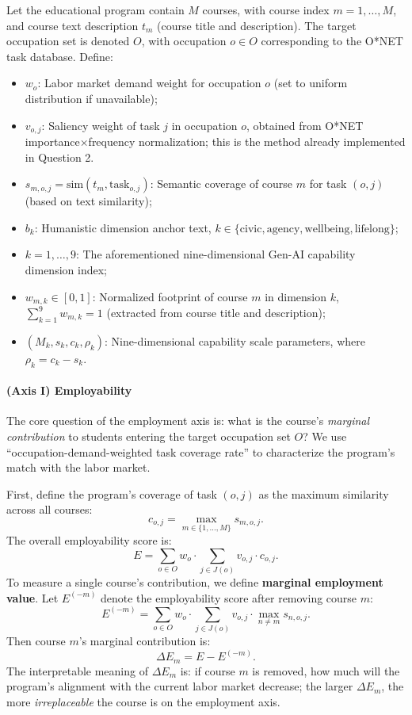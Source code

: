 Let the educational program contain $M$ courses, with course index $m=1,\ldots,M$, and course text description $t_m$ (course title and description). The target occupation set is denoted $O$, with occupation $o\in O$ corresponding to the O*NET task database. Define:
\begin{itemize}
    \item $w_o$: Labor market demand weight for occupation $o$ (set to uniform distribution if unavailable);
    \item $v_{o,j}$: Saliency weight of task $j$ in occupation $o$, obtained from O*NET importance$\times$frequency normalization; this is the method already implemented in Question 2.
    \item $s_{m,o,j}=\mathrm{sim}(t_m,\mathrm{task}_{o,j})$: Semantic coverage of course $m$ for task $(o,j)$ (based on text similarity);
    \item $b_k$: Humanistic dimension anchor text, $k\in\{\mathrm{civic,agency,wellbeing,lifelong}\}$;
    \item $k=1,\ldots,9$: The aforementioned nine-dimensional Gen-AI capability dimension index;
    \item $w_{m,k}\in[0,1]$: Normalized footprint of course $m$ in dimension $k$, $\sum_{k=1}^9 w_{m,k}=1$ (extracted from course title and description);
    \item $(M_k,s_k,c_k,\rho_k)$: Nine-dimensional capability scale parameters, where $\rho_k=c_k-s_k$.
\end{itemize}

\paragraph{(Axis I) Employability}
The core question of the employment axis is: what is the course's \emph{marginal contribution} to students entering the target occupation set $O$? We use ``occupation-demand-weighted task coverage rate'' to characterize the program's match with the labor market.

First, define the program's coverage of task $(o,j)$ as the maximum similarity across all courses:
\begin{equation}
    c_{o,j}=\max_{m\in\{1,\ldots,M\}} s_{m,o,j}.
\end{equation}
The overall employability score is:
\begin{equation}
    E=\sum_{o\in O} w_o \cdot \sum_{j\in J(o)} v_{o,j}\cdot c_{o,j}.
\end{equation}
To measure a single course's contribution, we define \textbf{marginal employment value}. Let $E^{(-m)}$ denote the employability score after removing course $m$:
\begin{equation}
    E^{(-m)}=\sum_{o\in O} w_o \cdot \sum_{j\in J(o)} v_{o,j}\cdot \max_{n\neq m} s_{n,o,j}.
\end{equation}
Then course $m$'s marginal contribution is:
\begin{equation}
    \Delta E_m=E-E^{(-m)}.
\end{equation}
The interpretable meaning of $\Delta E_m$ is: if course $m$ is removed, how much will the program's alignment with the current labor market decrease; the larger $\Delta E_m$, the more \emph{irreplaceable} the course is on the employment axis.

